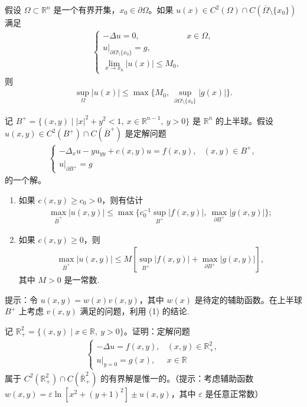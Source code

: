 \documentclass[../../main.tex]{subfiles}%
\begin{document}
\begin{example}
假设 $\Omega\subset\mathbb{R}^n$ 是一个有界开集，$x_0\in\partial\Omega$。如果 $u(x)\in C^2(\Omega)\cap C(\overline{\Omega}\setminus\{x_0\})$ 满足
\begin{align*}
\begin{cases}
-\Delta u = 0, & x\in\Omega, \\
u|_{\partial\Omega\setminus\{x_0\}} = g, \\
\lim_{x\to x_0} |u(x)| \leqslant M_0,
\end{cases}
\end{align*}
则
\begin{align*}
\sup_{\Omega} |u(x)| \leqslant \max\{M_0,\ \sup_{\partial\Omega\setminus\{x_0\}}|g(x)|\}.
\end{align*}
\end{example}

\begin{example}
记 $B^+=\{(x,y) \mid |x|^2+y^2<1,\ x\in\mathbb{R}^{n-1},\ y>0\}$ 是 $\mathbb{R}^n$ 的上半球。假设 $u(x,y)\in C^2(B^+)\cap C(\overline{B}^+)$ 是定解问题
\begin{align*}
\begin{cases}
-\Delta_x u - y u_{yy} + c(x,y)u = f(x,y), & (x,y)\in B^+, \\
u|_{\partial B^+} = g
\end{cases}
\end{align*}
的一个解。
\begin{enumerate}[(1)]
\item 如果 $c(x,y)\geqslant c_0>0$，则有估计
\begin{align*}
\max_{\overline{B}^+} |u(x,y)| \leqslant \max\{c_0^{-1}\sup_{B^+}|f(x,y)|,\ \max_{\partial B^+}|g(x,y)|\};
\end{align*}
\item 如果 $c(x,y)\geqslant 0$，则
\begin{align*}
\max_{\overline{B}^+} |u(x,y)| \leqslant M[\sup_{B^+}|f(x,y)| + \max_{\partial B^+}|g(x,y)|],
\end{align*}
其中 $M>0$ 是一常数.
\end{enumerate}
\end{example}
\begin{note}
提示：令 $u(x,y)=w(x)v(x,y)$，其中 $w(x)$ 是待定的辅助函数。在上半球 $B^+$ 上考虑 $v(x,y)$ 满足的问题，利用 (1) 的结论.
\end{note}

\begin{example}
记 $\mathbb{R}_+^2=\{(x,y) \mid x\in\mathbb{R},\ y>0\}$。证明：定解问题
\begin{align*}
\begin{cases}
-\Delta u = f(x,y), & (x,y)\in\mathbb{R}_+^2, \\
u|_{y=0} = g(x), & x\in\mathbb{R}
\end{cases}
\end{align*}
属于 $C^2(\mathbb{R}_+^2)\cap C(\overline{\mathbb{R}}_+^2)$ 的有界解是惟一的。（提示：考虑辅助函数 $w(x,y)=\varepsilon\ln[x^2+(y+1)^2]\pm u(x,y)$，其中 $\varepsilon$ 是任意正常数）
\end{example}
\end{document}
